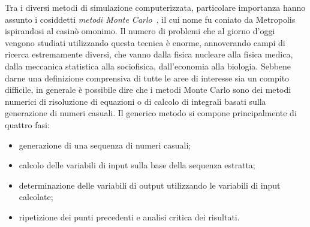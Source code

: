 Tra i diversi metodi di simulazione computerizzata, particolare importanza hanno assunto i cosiddetti \emph{metodi Monte Carlo}~\cite{metropolis:jasa49}, il cui nome fu coniato da Metropolis ispirandosi al casinò omonimo.
%
Il numero di problemi che al giorno d'oggi vengono studiati utilizzando questa tecnica è enorme, annoverando campi di ricerca estremamente diversi, che vanno dalla fisica nucleare alla fisica medica, dalla meccanica statistica alla sociofisica, dall'economia alla biologia.
%
%
%
Sebbene darne una definizione comprensiva di tutte le aree di interesse sia un compito difficile, in generale è possibile dire che i metodi Monte Carlo sono dei metodi numerici di risoluzione di equazioni o di calcolo di integrali basati sulla generazione di numeri casuali.
Il generico metodo si compone principalmente di quattro fasi:
\begin{itemize}
	\item generazione di una sequenza di numeri casuali;
	\item calcolo delle variabili di input sulla base della sequenza estratta;
	\item determinazione delle variabili di output utilizzando le variabili di input calcolate;
	\item ripetizione dei punti precedenti e analisi critica dei risultati.
\end{itemize}



